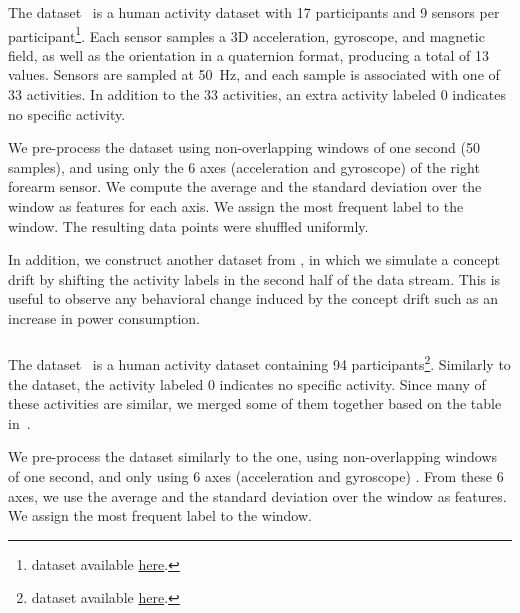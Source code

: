 \subsubsection{\banosdataset}
The \banosdataset dataset~\cite{Banos_2014} is a
human activity dataset with 17 participants
and 9 sensors per
participant\footnote{\banosdataset dataset
available
\href{https://archive.ics.uci.edu/ml/datasets/REALDISP+Activity+Recognition+Dataset\#:\~:text=The\%20REALDISP\%20(REAListic\%20sensor\%20DISPlacement,\%2Dplacement\%20and\%20induced\%2Ddisplacement.}{here}.}. Each sensor samples a 3D
acceleration, gyroscope, and magnetic field, as
well as the orientation in a quaternion format,
producing a total of 13 values.  Sensors are
sampled at 50~Hz, and each sample is associated
with one of 33 activities. In addition to the 33
activities, an extra activity labeled 0 indicates
no specific activity.

We pre-process the \banosdataset dataset using
non-overlapping windows of one second (50
samples), and using only the 6 axes (acceleration
and gyroscope)
of the right forearm sensor. We compute the average and the standard deviation over the
window as features for each axis. We assign the most
frequent label to the window.  The resulting data
points were shuffled uniformly.

In addition, we construct another dataset from \banosdataset, in which we
simulate a concept drift by shifting the activity labels in the
second half of the data stream. This is useful to
observe any behavioral change induced by the
concept drift such as an increase in power
consumption.

\subsubsection{\recofitdataset}
The \recofitdataset dataset~\cite{recofit} is a
human activity dataset containing 94
participants\footnote{\recofitdataset dataset
available
\href{https://msropendata.com/datasets/799c1167-2c8f-44c4-929c-227bf04e2b9a}{here}.}. Similarly to the \banosdataset
dataset, the activity labeled 0 indicates no
specific activity.
Since many of these activities are similar, we
merged some of them together based on the table
in~\cite{behzad2019}. 

We pre-process the dataset similarly to the
\banosdataset one, using non-overlapping windows of
one second, and only using 6 axes (acceleration
and gyroscope)
. From these 6 axes, we use the average and the standard deviation
over the window as features. We assign the most
frequent label to the window.

